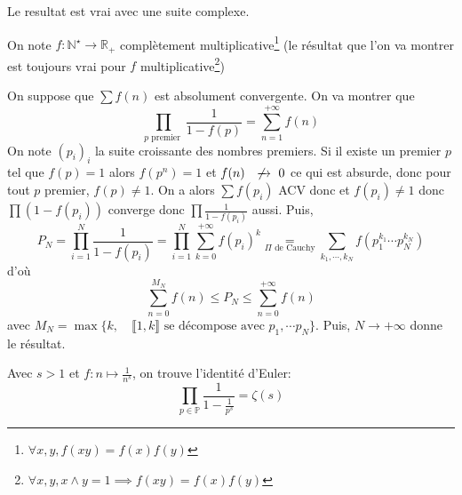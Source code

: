 \begin{rem}
    Le resultat est vrai avec une suite complexe.
\end{rem}

\begin{ex}
    On note $f:\mathbb N^\star\longrightarrow \mathbb R_+$ complètement multiplicative\footnote{$\forall x,y, f(xy)=f(x)f(y)$} (le résultat que l'on va montrer est toujours vrai pour $f$ multiplicative\footnote{$\forall x,y, x\land y=1\implies f(xy)=f(x)f(y)$})

    On suppose que $\sum f(n)$ est absolument convergente. On va montrer que \[
        \prod_{p\text{ premier }} \frac1{1-f(p)}=\sum_{n=1}^{+\infty}f(n)
    \]
    On note $(p_i)_i$ la suite croissante des nombres premiers. Si il existe un premier $p$ tel que $f(p)=1$ alors $f(p^n)=1$ et $f(n)\xnrightarrow{}0$ ce qui est absurde, donc pour tout $p$ premier, $f(p)\neq 1$.
    On a alors $\sum f(p_i)$ ACV donc et $f(p_i)\neq 1$ donc $\prod (1-f(p_i))$ converge donc $\prod \frac1{1-f(p_i)}$ aussi. Puis, \[
        P_N=\prod_{i=1}^N\frac1{1-f(p_i)}=\prod_{i=1}^N \sum_{k=0}^{+\infty}f(p_i)^k\underset{\Pi\text{ de Cauchy}}=\sum_{k_1, \cdots, k_N}f(p_1^{k_1}\cdots p_N^{k_N})
    \]
    d'où \[
        \sum_{n=0}^{M_N}f(n)\leq P_N\leq\sum_{n=0}^{+\infty}f(n)
    \]
    avec $M_N=\max \{k, \quad \llbracket 1, k\rrbracket\text{ se décompose avec } p_1, \cdots p_N\}$. Puis, $N\to+\infty$ donne le résultat.
\end{ex}

Avec $s>1$ et $f:n\longmapsto \frac1{n^s}$, on trouve l'identité d'Euler: \[
    \prod_{p\in\mathbb P}\frac1{1-\frac1{p^s}}=\zeta(s)
\]

\endchapter
